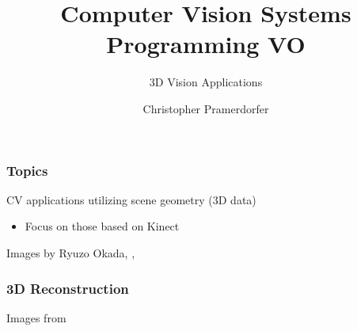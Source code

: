 \documentclass[xetex,professionalfont]{beamer}
\title{Computer Vision Systems Programming VO}
\subtitle{3D Vision Applications}
\author{Christopher Pramerdorfer}
\institute{Computer Vision Lab, Vienna University of Technology}
\begin{document}

\begin{frame}
\maketitle
\end{frame}


\begin{frame}
\frametitle{Topics}

CV applications utilizing scene geometry (3D data)
\begin{itemize}
	\item Focus on those based on Kinect %
\end{itemize}

\bigskip
\begin{center}
    {\centering Images by Ryuzo Okada, \cite{shotton2011}, \cite{newcombe2011}}
\end{center}

\end{frame}


\begin{frame}
\frametitle{3D Reconstruction}

\begin{center}
    {\centering Images from \cite{curless1996}}
\end{center}

\end{frame}
\end{document}

